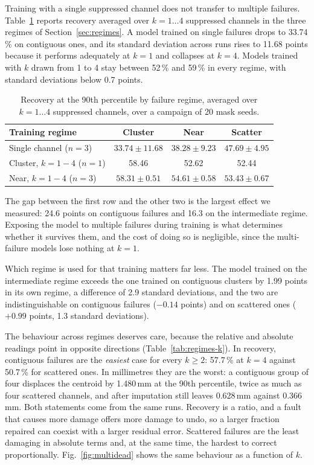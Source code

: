 \documentclass[10pt,conference]{IEEEtran}
\begin{document}
Training with a single suppressed channel does not transfer to multiple
failures. Table~\ref{tab:multidead} reports recovery averaged over $k=1\dots4$
suppressed channels in the three regimes of
Section~\ref{sec:regimes}. A model trained on single failures drops to
33.74\,\% on contiguous ones, and its standard deviation across runs rises to
11.68 points because it performs adequately at $k=1$ and collapses at $k=4$.
Models trained with $k$ drawn from 1 to 4 stay between 52\,\% and 59\,\% in
every regime, with standard deviations below 0.7 points.

\begin{table}[t]
\centering
\caption{Recovery at the 90th percentile by failure regime, averaged over
$k=1\dots4$ suppressed channels, over a campaign of 20 mask seeds.}
\label{tab:multidead}
\begin{tabular}{@{}lccc@{}}
\toprule
\textbf{Training regime} & \textbf{Cluster} & \textbf{Near} & \textbf{Scatter} \\
\midrule
Single channel ($n{=}3$)
  & $33.74 \pm 11.68$ & $38.28 \pm 9.23$ & $47.69 \pm 4.95$ \\
Cluster, $k{=}1\!-\!4$ ($n{=}1$)
  & 58.46 & 52.62 & 52.44 \\
Near, $k{=}1\!-\!4$ ($n{=}3$)
  & $58.31 \pm 0.51$ & $54.61 \pm 0.58$ & $53.43 \pm 0.67$ \\
\bottomrule
\end{tabular}
\end{table}

The gap between the first row and the other two is the largest effect we
measured: 24.6 points on contiguous failures and 16.3 on the intermediate
regime. Exposing the model to multiple failures during training is what
determines whether it survives them, and the cost of doing so is negligible,
since the multi-failure models lose nothing at $k=1$.

Which regime is used for that training matters far less. The model trained on
the intermediate regime exceeds the one trained on contiguous clusters by 1.99
points in its own regime, a difference of 2.9 standard deviations, and the two
are indistinguishable on contiguous failures ($-0.14$ points) and on scattered
ones ($+0.99$ points, 1.3 standard deviations).

The behaviour across regimes deserves care, because the relative and absolute
readings point in opposite directions (Table~\ref{tab:regimes-k}). In recovery,
contiguous failures are the \emph{easiest} case for every $k \ge 2$: 57.7\,\%
at $k=4$ against 50.7\,\% for scattered ones. In millimetres they are the
worst: a contiguous group of four displaces the centroid by 1.480\,mm at the
90th percentile, twice as much as four scattered channels, and after imputation
still leaves 0.628\,mm against 0.366\,mm. Both statements come from the same
runs. Recovery is a ratio, and a fault that causes more damage offers more
damage to undo, so a larger fraction repaired can coexist with a larger
residual error. Scattered failures are the least damaging in absolute terms
and, at the same time, the hardest to correct proportionally.
Fig.~\ref{fig:multidead} shows the same behaviour as a function of $k$.
\end{document}
